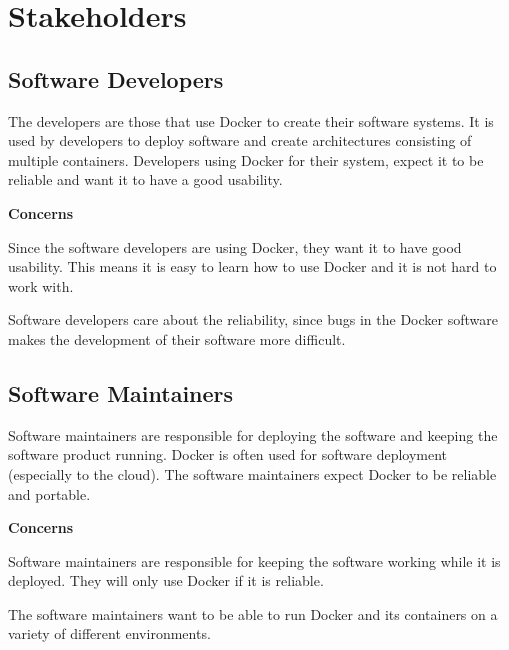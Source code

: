 
\section{Stakeholders}
\label{sec:stakeholders}


\subsection*{Software Developers}
The developers are those that use Docker to create their software systems. It is used by developers to deploy software and create architectures consisting of multiple containers. Developers using Docker for their system, expect it to be reliable and want it to have a good usability. 

\textbf{Concerns}
\begin{description}[labelindent=25pt,style=multiline,leftmargin=4.5cm,font=\normalfont\itshape]

\item[Usability] Since the software developers are using Docker, they want it to have good usability. This means it is easy to learn how to use Docker and it is not hard to work with. 

\item[Reliability] Software developers care about the reliability, since bugs in the Docker software makes the development of their software more difficult. 

\end{description}

\subsection*{Software Maintainers}
Software maintainers are responsible for deploying the software and keeping the software product running. Docker is often used for software deployment (especially to the cloud). %
The software maintainers expect Docker to be reliable and portable.

\textbf{Concerns}
\begin{description}[labelindent=25pt,style=multiline,leftmargin=4.5cm,font=\normalfont\itshape]

\item[Reliability] Software maintainers are responsible for keeping the software working while it is deployed. They will only use Docker if it is reliable. 

\item[Portability] The software maintainers want to be able to run Docker and its containers on a variety of different environments.

\end{description}



